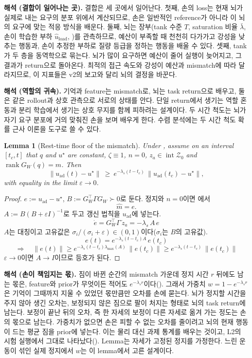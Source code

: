 \documentclass[11pt]{article}\usepackage[margin=1in]{geometry}\usepackage{amsmath,amssymb,amsthm,mathtools}\usepackage{graphicx}\graphicspath{{figures/}{../figures/}{figs/}{./}}\usepackage{enumitem}\usepackage{hyperref}\usepackage{cleveref}\usepackage{tikz}\usetikzlibrary{arrows.meta,positioning,calc,shapes.geometric}\usepackage{float}\usepackage{rotating}\usepackage[most]{tcolorbox}\usepackage{kotex}\usepackage{booktabs}\usepackage{longtable}\emergencystretch=1.6em\tolerance=2000 \crefname{assumption}{Assumption}{Assumptions}\Crefname{assumption}{Assumption}{Assumptions}\crefname{definition}{Definition}{Definitions}\Crefname{definition}{Definition}{Definitions}\crefname{proposition}{Proposition}{Propositions}\Crefname{proposition}{Proposition}{Propositions}\crefname{fact}{Fact}{Facts}\Crefname{fact}{Fact}{Facts} \newtheorem{assumption}{Assumption}\newtheorem{definition}{Definition}\newtheorem{lemma}{Lemma}\newtheorem{proposition}{Proposition}\newtheorem{theorem}{Theorem}\newtheorem{corollary}{Corollary}\newtheorem{fact}{Fact}\theoremstyle{remark}\newtheorem{remark}{Remark} \newcommand{\R}{\mathbb{R}}\newcommand{\xb}{\bar x}\newcommand{\Ab}{\bar A}\newcommand{\By}{\bar B_y}\newcommand{\U}{\mathcal U}\newcommand{\Z}{\mathcal Z}
\begin{document}
\textbf{해석 (결합이 일어나는 곳).} 결합은 세 곳에서 일어난다. 첫째, 손의 loss는 현재 뇌가 실제로 내는 요구의 분포 위에서 계산되므로, 손은 일반적인 reference가 아니라 이 뇌의 요구에 맞는 적응 방식을 배운다. 둘째, 뇌는 장부(tank 수준 $T$, saturation 비율 $\bar\lambda$, 손이 학습한 부하 $\hat u_{\mathrm{load}}$, )를 관측하므로, 예산이 부족할 때 천천히 다가가고 강성을 낮추는 행동과, 손이 추정한 부하로 질량 등급을 정하는 행동을 배울 수 있다. 셋째, tank가 두 층을 동역학으로 묶는다. 뇌가 많이 요구하면 예산이 줄어 실행이 늦어지고, 그 결과가 return으로 돌아온다. 최적의 접근 속도와 강성이 예산과 mismatch에 따라 달라지므로, 이 지표들은 v2의 보고와 달리 뇌의 결정을 바꾼다.

\textbf{해석 (역할의 귀속).} 기억과 feature는 mismatch로, 뇌는 task return으로 배우고, 둘은 같은 rollout과 상호 관측으로 서로의 상태를 안다. 단일 return에서 생기는 역할 혼동과 분리 학습에서 생기는 상호 무지를 함께 피하려는 설계이다. 두 시간 척도는 뇌가 자기 요구 분포에 거의 맞춰진 손을 보며 배우게 한다. 수렴 분석에는 두 시간 척도 확률 근사 이론을 도구로 쓸 수 있다.

\begin{lemma}[Rest-time floor of the mismatch]
\label{lem:restfloor}
Under , assume on an interval $[t_c,t]$ that $q$ and $u^\star$ are constant, $\zeta\equiv1$, $n=0$, $z_a\in\operatorname{int}\mathcal Z_0$ and $\operatorname{rank}G_W(q)=m$. Then
\[
\|u_{\mathrm{ad}}(t)-u^\star\|\ \ge\ e^{-\lambda_s(t-t_c)}\,\|u_{\mathrm{ad}}(t_c)-u^\star\|,
\]
with equality in the limit $\varepsilon\to0$.
\end{lemma}

\begin{proof}
$e:=u_{\mathrm{ad}}-u^\star$, $B:=G_W^\top\Gamma G_W\succ0$로 둔다. 정지와 $n=0$이면 에서
\[
\hat m=e .
\]
$A:=B(B+\varepsilon I)^{-1}$로 두고 갱신 법칙을 $u_{\mathrm{ad}}$에 넣는다.
\[
\dot e=G_W^\top\Gamma\,\dot z_a=-\lambda_s\,A\,e
\]
$A$는 대칭이고 고유값은 $\sigma_i/(\sigma_i+\varepsilon)\in(0,1)$이다($\sigma_i$는 $B$의 고유값).
\[
e(t)=e^{-\lambda_s(t-t_c)A}\,e(t_c)
\]
\[
\Longrightarrow\quad \|e(t)\|\ge e^{-\lambda_s(t-t_c)\lambda_{\max}(A)}\,\|e(t_c)\|\ge e^{-\lambda_s(t-t_c)}\,\|e(t_c)\|
\]
$\varepsilon\to0$이면 $A\to I$이므로 등호가 된다.
\end{proof}

\textbf{해석 (손이 책임지는 몫).} 짐이 바뀐 순간의 mismatch 가운데 정지 시간 $r$ 뒤에도 남는 몫은, feature와 prior가 무엇이든 적어도 $e^{-\lambda_s r}$이다(). 그래서 가중치 $w=1-e^{-\lambda_s r}$은 기억이 그때까지 지울 수 있었던 몫만큼만 오차를 손에 묻는다. 뇌가 정지할 시간을 주지 않아 생긴 오차는, 보정되지 않은 짐으로 팔이 처지는 형태로 뇌의 task return에 남는다. 보정이 끝난 뒤의 오차, 즉 한 자세의 보정이 다른 자세로 옮겨 가는 정도는 손의 몫으로 남는다. 가중치가 없으면 손은 피할 수 없는 오차를 줄이려고 뇌의 현재 행동이 드는 평균 짐을 prior에 넣는다. 이는 물리 대신 과제 통계를 배우는 것이고, L2의 시험 실행에서 그대로 나타났다(). Lemma는 자세가 고정된 정지를 가정한다. 느린 운동이 섞인 실제 정지에서 $w$는 이 lemma에서 고른 설계이다.
\end{document}
